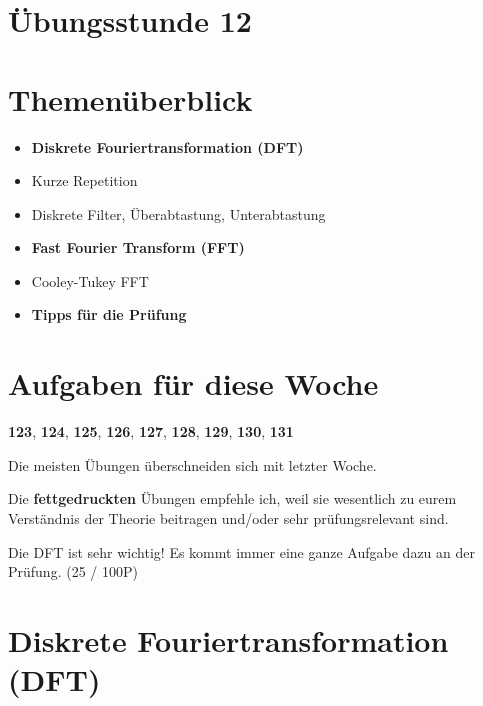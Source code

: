 \documentclass[11pt]{article}
\begin{document}
\thispagestyle{firstpage}

\setlength{\headheight}{1 \baselineskip}  %
\setlength{\parindent}{0pt}  %
\setlength{\parskip}{\baselineskip}  %

\vspace*{-5px}
\section*{Übungsstunde 12}

\section*{Themenüberblick}
\begin{itemize}
    \item \textbf{Diskrete Fouriertransformation (DFT)}
    \item[] Kurze Repetition
    \item[] Diskrete Filter, Überabtastung, Unterabtastung
    \item \textbf{Fast Fourier Transform (FFT)}
    \item[] Cooley-Tukey FFT
    \item \textbf{Tipps für die Prüfung}
\end{itemize}

\section*{Aufgaben für diese Woche}
\vspace{-0.5cm}

\textbf{123}, \textbf{124}, \textbf{125}, \textbf{126}, \textbf{127}, \textbf{128}, \textbf{129}, \textbf{130}, \textbf{131}\\
\vspace{-0.5cm}

Die meisten Übungen überschneiden sich mit letzter Woche.

Die \textbf{fettgedruckten} Übungen empfehle ich, weil sie wesentlich zu eurem Verständnis der Theorie beitragen und/oder sehr prüfungsrelevant sind.

Die DFT ist \textcolor{myred}{sehr wichtig}! Es kommt immer eine ganze Aufgabe dazu an der Prüfung. (25 / 100P)

\vfill \null
\pagebreak

\section*{Diskrete Fouriertransformation (DFT)}
\vspace*{-0.5cm}
\end{document}
